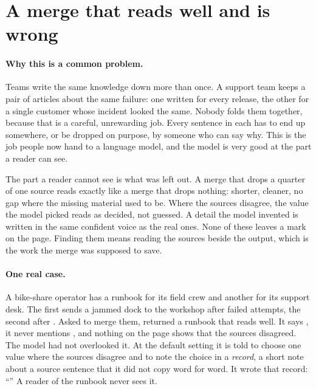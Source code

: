 \section{A merge that reads well and is wrong}
\label{sec:problem}

\paragraph{Why this is a common problem.} Teams write the same knowledge down more than once. A support team keeps a pair of articles about the same failure: one written for every release, the other for a single customer whose incident looked the same. Nobody folds them together, because that is a careful, unrewarding job. Every sentence in each has to end up somewhere, or be dropped on purpose, by someone who can say why. This is the job people now hand to a language model, and the model is very good at the part a reader can see.

The part a reader cannot see is what was left out. A merge that drops a quarter of one source reads exactly like a merge that drops nothing: shorter, cleaner, no gap where the missing material used to be. Where the sources disagree, the value the model picked reads as decided, not guessed. A detail the model invented is written in the same confident voice as the real ones. None of these leaves a mark on the page. Finding them means reading the sources beside the output, which is the work the merge was supposed to save.

\paragraph{One real case.} A bike-share operator has a runbook for its field crew and another for its support desk. The first sends a jammed dock to the workshop after  failed attempts, the second after . Asked to merge them,  returned a runbook that reads well. It says , it never mentions , and nothing on the page shows that the sources disagreed. The model had not overlooked it. At the default setting it is told to choose one value where the sources disagree and to note the choice in a \emph{record}, a short note about a source sentence that it did not copy word for word. It wrote that record: ``'' A reader of the runbook never sees it.

